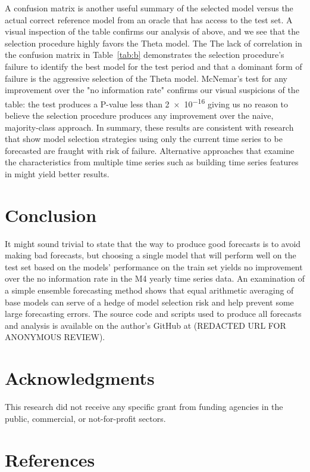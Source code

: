 \documentclass[11pt,3p,review,authoryear]{elsarticle}
\begin{document}
A confusion matrix is another useful summary of the selected model versus the actual correct reference model from an oracle that has access to the test set. A visual inspection of the table confirms our analysis of above, and we see that the selection procedure highly favors the Theta model. The The lack of correlation in the confusion matrix in Table~\ref{tab:b} demonstrates the selection procedure's failure to identify the best model for the test period and that a dominant form of failure is the aggressive selection of the Theta model. McNemar's test \citep{MCNEMAR} for any improvement over the "no information rate" confirms our visual suspicions of the table: the test produces a P-value less than \num{2e-16} giving us no reason to believe the selection procedure produces any improvement over the naive, majority-class approach.  In summary, these results are consistent with research that show model selection strategies using only the current time series to be forecasted are fraught with risk of failure. Alternative approaches that examine the characteristics from multiple time series such as building time series features in \cite{modelSelection} might yield better results.


\section{Conclusion}
It might sound trivial to state that the way to produce good forecasts is to avoid making bad forecasts, but choosing a single model that will perform well on the test set based on the models' performance on the train set yields no improvement over the no information rate in the M4 yearly time series data. An examination of a simple ensemble forecasting method shows that equal arithmetic averaging of base models can serve of a hedge of model selection risk and help prevent some large forecasting errors. The source code and scripts used to produce all forecasts and analysis is available on the author's GitHub at (REDACTED URL FOR ANONYMOUS REVIEW).

\section*{Acknowledgments}

This research did not receive any specific grant from funding agencies in the public, commercial, or not-for-profit sectors.


\section{References}

\end{document}
